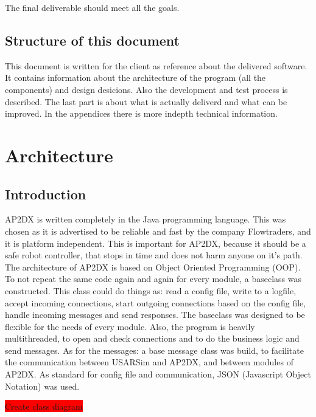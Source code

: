 \documentclass[titlepage, a4paper,10pt]{article}
\newcommand{\todo}[1]{\colorbox{red}{\color{white}#1}}
\begin{document}
The final deliverable should meet all the goals. 

\subsection{Structure of this document}
This document is written for the client as reference about the delivered software. It contains information about the architecture of the program (all the components) and design desicions. Also the development and test process is described. The last part is about what is actually deliverd and what can be improved. In the appendices there is more indepth technical information.

\newpage

\section{Architecture}
\subsection{Introduction}
AP2DX is written completely in the Java programming language. 
This was chosen as it is advertised to be reliable and fast by the company Flowtraders, and it is platform independent. This is important for AP2DX, because it should be a safe robot controller, that stops in time and does not harm anyone on it's path. The architecture of AP2DX is based on Object Oriented Programming (OOP).
To not repeat the same code again and again for every module, a baseclass was constructed. 
This class could do things as: read a config file, write to a logfile, accept incoming connections, start outgoing connections based on the config file, handle incoming messages and send responses.
The baseclass was designed to be flexible for the needs of every module. Also, the program is heavily multithreaded, to open and check connections and to do the business logic and send messages. As for the messages: a base message class was build, to facilitate the communication between USARSim and AP2DX, and between modules of AP2DX. As standard for config file and communication, JSON (Javascript Object Notation) was used. 

\todo{Create class diagram}
\end{document}
